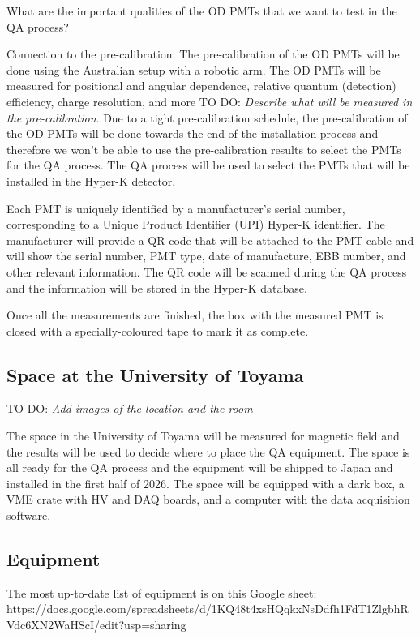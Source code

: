 \documentclass[12pt,a4paper]{article}
\newcommand{\todo}[1]{\textcolor{red!90!black}{TO DO: \textit{#1}}}
\begin{document}
What are the important qualities of the OD PMTs that we want to test in the QA process?

Connection to the pre-calibration.
The pre-calibration of the OD PMTs will be done using the Australian setup with a robotic arm. The OD PMTs will be measured for positional and angular dependence, relative quantum (detection) efficiency, charge resolution, and more \todo{Describe what will be measured in the pre-calibration}. Due to a tight pre-calibration schedule, the pre-calibration of the OD PMTs will be done towards the end of the installation process and therefore we won't be able to use the pre-calibration results to select the PMTs for the QA process. The QA process will be used to select the PMTs that will be installed in the Hyper-K detector.

Each PMT is uniquely identified by a manufacturer's serial number, corresponding to a Unique Product Identifier (UPI) Hyper-K identifier. The manufacturer will provide a QR code that will be attached to the PMT cable and will show the serial number, PMT type, date of manufacture, EBB number, and other relevant information. The QR code will be scanned during the QA process and the information will be stored in the Hyper-K database.

Once all the measurements are finished, the box with the measured PMT is closed with a specially-coloured tape to mark it as complete.

\subsection{Space at the University of Toyama}
\todo{Add images of the location and the room}

The space in the University of Toyama will be measured for magnetic field and the results will be used to decide where to place the QA equipment. The space is all ready for the QA process and the equipment will be shipped to Japan and installed in the first half of 2026. The space will be equipped with a dark box, a VME crate with HV and DAQ boards, and a computer with the data acquisition software.

\subsection{Equipment}
The most up-to-date list of equipment is on this Google sheet: https://docs.google.com/spreadsheets/d/1KQ48t4xsHQqkxNsDdfh1FdT1ZlgbhRVdc6XN2WaHScI/edit?usp=sharing 
\end{document}
